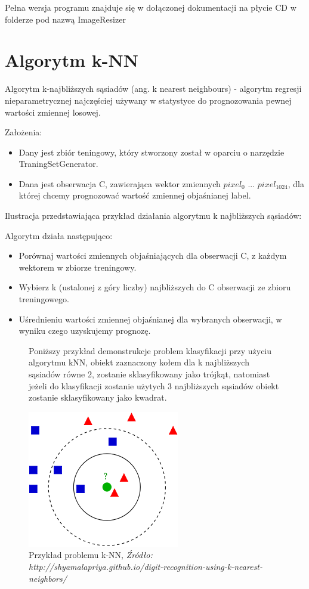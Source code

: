 \documentclass[brudnopis]{xmgr}
\begin{document}
Pełna wersja programu znajduje się w dołączonej dokumentacji na płycie CD w folderze pod nazwą ImageResizer
\newpage

\section{Algorytm k-NN}

Algorytm k-najbliższych sąsiadów (ang. k nearest neighbours)\cite{2}\cite{11} - algorytm regresji nieparametrycznej najczęściej używany w statystyce do prognozowania pewnej wartości zmiennej losowej.

Założenia:
\begin{itemize}
\item
Dany jest zbiór teningowy, który stworzony został w oparciu o narzędzie TraningSetGenerator.
\item
Dana jest obserwacja C, zawierająca wektor zmiennych $pixel_{0}$ ... $pixel_{1024}$, dla której chcemy prognozować wartość zmiennej objaśnianej label.
\end{itemize}	

   Ilustracja przedstawiająca przykład działania algorytmu k najbliższych sąsiadów:

Algorytm działa następująco:
\begin{itemize}
\item
Porównaj wartości zmiennych objaśniających dla obserwacji C, z każdym wektorem w zbiorze treningowy.
\item
Wybierz k (ustalonej z góry liczby) najbliższych do C obserwacji ze zbioru treningowego.
\item
Uśrednieniu wartości zmiennej objaśnianej dla wybranych obserwacji, w wyniku czego uzyskujemy prognozę.	
\end{itemize}	
     
\begin{figure}[!tbh]

Poniższy przykład demonstrukcje problem klasyfikacji przy użyciu algorytmu kNN, obiekt zaznaczony kołem dla k najbliższych sąsiadów równe 2, zostanie sklasyfikowany jako trójkąt, natomiast jeżeli do klasyfikacji zostanie użytych 3 najbliższych sąsiadów obiekt zostanie sklasyfikowany jako kwadrat.

\centering
\includegraphics[width=.6\hsize]{fig/knn}
\caption{Przykład problemu k-NN, \emph{Źródło: http://shyamalapriya.github.io/digit-recognition-using-k-nearest-neighbors/}}
\end{figure}
\newpage
\end{document}
